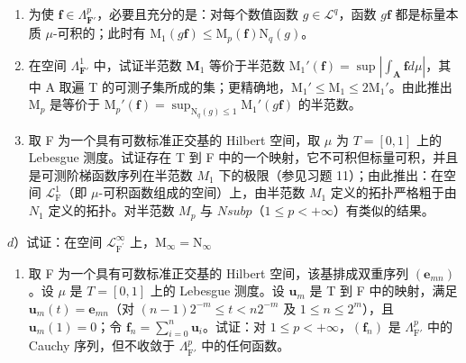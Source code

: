 \begin{enumerate}
\def\labelenumi{\alph{enumi})}
\item
  为使 \(\mathbf{f} \in \Lambda_{\mathbf{F}'}^p\)，必要且充分的是：对每个数值函数 \(g \in \mathcal{L}^q\)，函数 \(g\mathbf{f}\) 都是标量本质 \(\mu\)-可积的；此时有 \(\mathrm{M}_1(g\mathbf{f}) \leqslant \mathrm{M}_p(\mathbf{f})\mathrm{N}_q(g)\)。
\item
  在空间 \(\Lambda_{\mathbf{F}'}^1\) 中，试证半范数 \(\mathbf{M}_1\) 等价于半范数 \(\mathrm{M}_1'(\mathbf{f}) = \sup |\int_{\mathbf{A}} \mathbf{f} d\mu|\)，其中 A 取遍 T 的可测子集所成的集；更精确地，\(\mathrm{M}_1' \leqslant \mathrm{M}_1 \leqslant 2\mathrm{M}_1'\)。由此推出 \(\mathrm{M}_p\) 是等价于 \(\mathrm{M}_p'(\mathbf{f}) = \sup_{\mathrm{N}_q(g) \leqslant 1} \mathrm{M}_1'(g\mathbf{f})\) 的半范数。
\item
  取 F 为一个具有可数标准正交基的 Hilbert 空间，取 \(\mu\) 为 \(T = [0,1]\) 上的 Lebesgue 测度。试证存在 T 到 F 中的一个映射，它不可积但标量可积，并且是可测阶梯函数序列在半范数 \(M_1\) 下的极限（参见习题 11）；由此推出：在空间 \(\mathcal{L}_{\mathrm{F}}^1\)（即 \(\mu\)-可积函数组成的空间）上，由半范数 \(M_1\) 定义的拓扑严格粗于由 \(N_1\) 定义的拓扑。对半范数 \(M_p\) 与 \(N sub p\)（\(1 \leqslant p < +\infty\)）有类似的结果。
\end{enumerate}

\(d\)）试证：在空间 \(\mathcal{L}_{\mathrm{F}^{\prime}}^{\infty}\) 上，\(\mathrm{M}_{\infty} = \mathrm{N}_{\infty}\)

\begin{enumerate}
\def\labelenumi{\alph{enumi})}
\setcounter{enumi}{4}
\tightlist
\item
  取 F 为一个具有可数标准正交基的 Hilbert 空间，该基排成双重序列 \((\mathbf{e}_{mn})\)。设 \(\mu\) 是 \(T = [0,1]\) 上的 Lebesgue 测度。设 \(\mathbf{u}_m\) 是 T 到 F 中的映射，满足 \(\mathbf{u}_m(t) = \mathbf{e}_{mn}\)（对 \((n - 1)2^{-m} \leqslant t < n2^{-m}\) 及 \(1 \leqslant n \leqslant 2^m\)），且 \(\mathbf{u}_m(1) = 0\)；令 \(\mathbf{f}_n = \sum_{i=0}^{n} \mathbf{u}_i\)。试证：对 \(1 \leqslant p < +\infty\)，\((\mathbf{f}_n)\) 是 \(\Lambda_{\mathrm{F}'}^p\) 中的 Cauchy 序列，但不收敛于 \(\Lambda_{\mathrm{F}'}^p\) 中的任何函数。
\end{enumerate}

